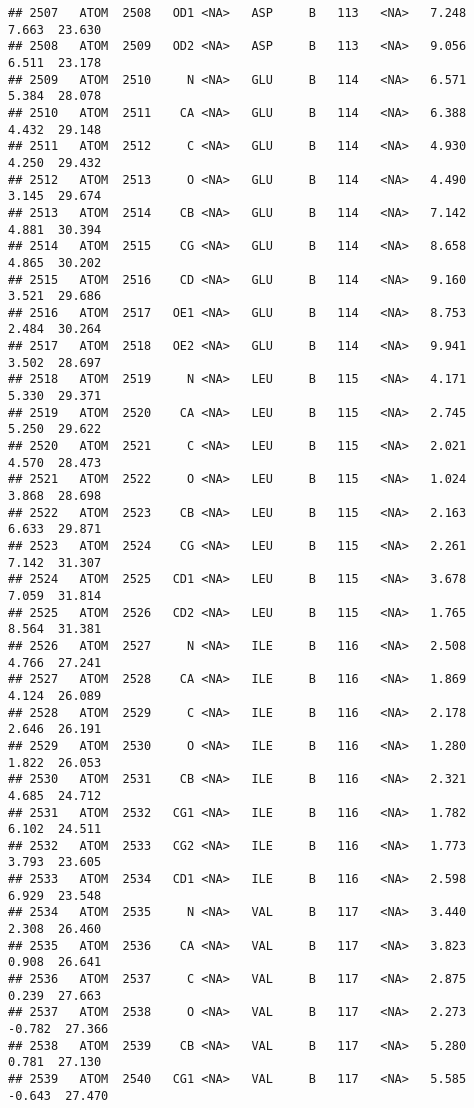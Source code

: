 \documentclass[
]{article}
\begin{document}
\begin{verbatim}
## 2507   ATOM  2508   OD1 <NA>   ASP     B   113   <NA>   7.248   7.663  23.630
## 2508   ATOM  2509   OD2 <NA>   ASP     B   113   <NA>   9.056   6.511  23.178
## 2509   ATOM  2510     N <NA>   GLU     B   114   <NA>   6.571   5.384  28.078
## 2510   ATOM  2511    CA <NA>   GLU     B   114   <NA>   6.388   4.432  29.148
## 2511   ATOM  2512     C <NA>   GLU     B   114   <NA>   4.930   4.250  29.432
## 2512   ATOM  2513     O <NA>   GLU     B   114   <NA>   4.490   3.145  29.674
## 2513   ATOM  2514    CB <NA>   GLU     B   114   <NA>   7.142   4.881  30.394
## 2514   ATOM  2515    CG <NA>   GLU     B   114   <NA>   8.658   4.865  30.202
## 2515   ATOM  2516    CD <NA>   GLU     B   114   <NA>   9.160   3.521  29.686
## 2516   ATOM  2517   OE1 <NA>   GLU     B   114   <NA>   8.753   2.484  30.264
## 2517   ATOM  2518   OE2 <NA>   GLU     B   114   <NA>   9.941   3.502  28.697
## 2518   ATOM  2519     N <NA>   LEU     B   115   <NA>   4.171   5.330  29.371
## 2519   ATOM  2520    CA <NA>   LEU     B   115   <NA>   2.745   5.250  29.622
## 2520   ATOM  2521     C <NA>   LEU     B   115   <NA>   2.021   4.570  28.473
## 2521   ATOM  2522     O <NA>   LEU     B   115   <NA>   1.024   3.868  28.698
## 2522   ATOM  2523    CB <NA>   LEU     B   115   <NA>   2.163   6.633  29.871
## 2523   ATOM  2524    CG <NA>   LEU     B   115   <NA>   2.261   7.142  31.307
## 2524   ATOM  2525   CD1 <NA>   LEU     B   115   <NA>   3.678   7.059  31.814
## 2525   ATOM  2526   CD2 <NA>   LEU     B   115   <NA>   1.765   8.564  31.381
## 2526   ATOM  2527     N <NA>   ILE     B   116   <NA>   2.508   4.766  27.241
## 2527   ATOM  2528    CA <NA>   ILE     B   116   <NA>   1.869   4.124  26.089
## 2528   ATOM  2529     C <NA>   ILE     B   116   <NA>   2.178   2.646  26.191
## 2529   ATOM  2530     O <NA>   ILE     B   116   <NA>   1.280   1.822  26.053
## 2530   ATOM  2531    CB <NA>   ILE     B   116   <NA>   2.321   4.685  24.712
## 2531   ATOM  2532   CG1 <NA>   ILE     B   116   <NA>   1.782   6.102  24.511
## 2532   ATOM  2533   CG2 <NA>   ILE     B   116   <NA>   1.773   3.793  23.605
## 2533   ATOM  2534   CD1 <NA>   ILE     B   116   <NA>   2.598   6.929  23.548
## 2534   ATOM  2535     N <NA>   VAL     B   117   <NA>   3.440   2.308  26.460
## 2535   ATOM  2536    CA <NA>   VAL     B   117   <NA>   3.823   0.908  26.641
## 2536   ATOM  2537     C <NA>   VAL     B   117   <NA>   2.875   0.239  27.663
## 2537   ATOM  2538     O <NA>   VAL     B   117   <NA>   2.273  -0.782  27.366
## 2538   ATOM  2539    CB <NA>   VAL     B   117   <NA>   5.280   0.781  27.130
## 2539   ATOM  2540   CG1 <NA>   VAL     B   117   <NA>   5.585  -0.643  27.470

\end{verbatim}
\end{document}
